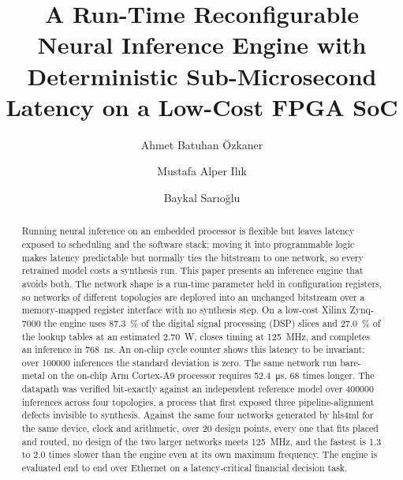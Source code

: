 \documentclass[final,5p,times,twocolumn]{elsarticle}
\begin{document}
\begin{frontmatter}

\title{
A Run-Time Reconfigurable Neural Inference Engine with
Deterministic Sub-Microsecond Latency on a Low-Cost FPGA SoC
}

\author[bilgi]{Ahmet Batuhan \"Ozkaner}

\author[bilgi]{Mustafa Alper Il{\i}k}

\author[bilgi]{Baykal Sar{\i}o\u{g}lu}


\address[bilgi]{Department of Electrical and Electronics Engineering,
Istanbul Bilgi University, Istanbul, T\"urkiye}

\begin{abstract}
Running neural inference on an embedded processor is flexible but leaves
latency exposed to scheduling and the software stack; moving it into
programmable logic makes latency predictable but normally ties the bitstream to
one network, so every retrained model costs a synthesis run. This paper
presents an inference engine that avoids both. The network shape is a run-time
parameter held in configuration registers, so networks of different topologies
are deployed into an unchanged bitstream over a memory-mapped register interface
with no synthesis step. On a low-cost Xilinx Zynq-7000 the engine uses
\SI{87.3}{\percent} of the digital signal processing (DSP) slices and
\SI{27.0}{\percent} of the lookup tables at an estimated \SI{2.70}{\watt},
closes timing at \SI{125}{\mega\hertz}, and completes an inference in
\SI{768}{\nano\second}. An on-chip cycle counter shows this latency to be
invariant: over \num{100000} inferences the standard deviation is zero. The same
network run bare-metal on the on-chip Arm Cortex-A9 processor requires
\SI{52.4}{\micro\second}, 68 times longer. The datapath was verified bit-exactly
against an independent reference model over \num{400000} inferences across four
topologies, a process that first exposed three pipeline-alignment defects
invisible to synthesis. Against the same four networks generated by hls4ml for
the same device, clock and arithmetic, over 20 design points, every one that
fits placed and routed, no design of the two larger networks meets \SI{125}{\mega\hertz},
and the fastest is 1.3 to 2.0 times slower than the engine even at its own
maximum frequency. The engine is evaluated end to end over Ethernet on a
latency-critical financial decision task.
\end{abstract}


\end{frontmatter}
\end{document}

